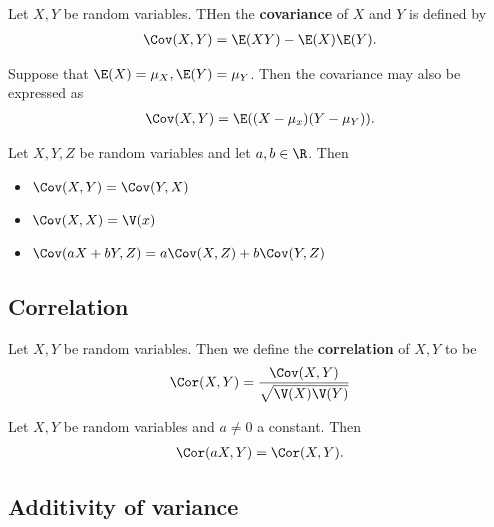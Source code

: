\documentclass{article}
\begin{document}
\begin{definition}
    Let $X,Y$ be random variables. THen the \textbf{covariance} of $X$ and $Y$ is defined by
    \begin{align*}
        \Cov(X,Y) = \E(XY)-\E(X)\E(Y).
    \end{align*}
\end{definition}

\begin{lemma}
    Suppose that $\E(X)=\mu_X, \E(Y)=\mu_Y$. Then the covariance may also
    be expressed as
    \begin{align*}
        \Cov(X,Y)=\E((X-\mu_x)(Y-\mu_Y)).
    \end{align*}
\end{lemma}

\begin{theorem}
    Let $X,Y,Z$ be random variables and let $a,b\in\R$. Then
    \begin{itemize}
        \item $\Cov(X,Y)=\Cov(Y,X)$
        \item $\Cov(X,X)=\V(x)$
        \item $\Cov(aX+bY, Z)=a\Cov(X,Z)+b\Cov(Y,Z)$
    \end{itemize}
\end{theorem}


\subsection{Correlation}


\begin{definition}
    Let $X,Y$ be random variables. Then we define the \textbf{correlation} of
    $X,Y$ to be
    \begin{align*}
        \Cor(X,Y)=\frac{\Cov(X,Y)}{\sqrt{\V(X)\V(Y)}}
    \end{align*}
\end{definition}
\begin{theorem}
    Let $X,Y$ be random variables and $a\not=0$ a constant. Then
    \begin{align*}
            \Cor(aX,Y)=\Cor(X,Y).
    \end{align*}
\end{theorem}


\subsection{Additivity of variance}
\end{document}
